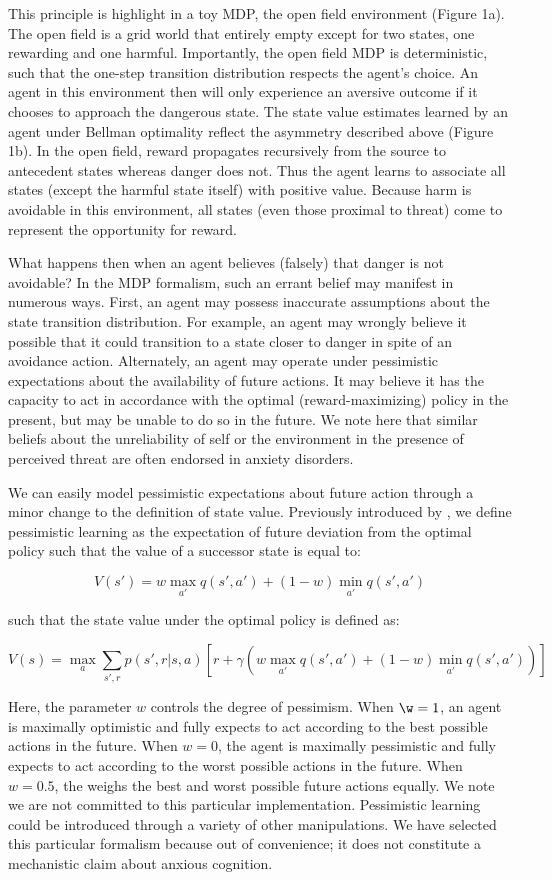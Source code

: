 \documentclass[11pt]{article} %
\begin{document}
This principle is highlight in a toy MDP, the open field environment (Figure 1a). The open field is a grid world that entirely empty except for two states, one rewarding and one harmful. Importantly, the open field MDP is deterministic, such that the one-step transition distribution respects the agent's choice. An agent in this environment then will only experience an aversive outcome if it chooses to approach the dangerous state. The state value estimates learned by an agent under Bellman optimality reflect the asymmetry described above (Figure 1b). In the open field, reward propagates recursively from the source to antecedent states whereas danger does not. Thus the agent learns to associate all states (except the harmful state itself) with positive value. Because harm is avoidable in this environment, all states (even those proximal to threat) come to represent the opportunity for reward.

What happens then when an agent believes (falsely) that danger is not avoidable? In the MDP formalism, such an errant  belief may manifest in numerous ways. First, an agent may possess inaccurate assumptions about the state transition distribution. For example, an agent may wrongly believe it possible that it could transition to a state closer to danger in spite of an avoidance action. Alternately, an agent may operate under pessimistic expectations about the availability of future actions. It may believe it has the capacity to act in accordance with the optimal (reward-maximizing) policy in the present, but may be unable to do so in the future. We note here that similar beliefs about the unreliability of self or the environment in the presence of perceived threat are often endorsed in anxiety disorders.

We can easily model pessimistic expectations about future action through a minor change to the definition of state value. Previously introduced by \cite{Gaskett2003}, we define pessimistic learning as the expectation of future deviation from the optimal policy such that the value of a successor state is equal to:

$$ V(s') = w \max_{a'} q(s',a') + (1 - w) \min_{a'} q(s',a') $$

such that the state value under the optimal policy is defined as:

$$ V(s) = \max_a \sum_{s',r}p(s',r|s,a) \left[ r + \gamma \left( w \max_{a'} q(s',a') + (1 - w) \min_{a'} q(s',a') \right) \right] $$

Here, the parameter $w$ controls the degree of pessimism. When $\w = 1$, an agent is maximally optimistic and fully expects to act according to the best possible actions in the future. When $w = 0$, the agent is maximally pessimistic and fully expects to act according to the worst possible actions in the future. When $w = 0.5$, the weighs the best and worst possible future actions equally. We note we are not committed to this particular implementation. Pessimistic learning could be introduced through a variety of other manipulations. We have selected this particular formalism because out of convenience; it does not constitute a mechanistic claim about anxious cognition.
\end{document}
